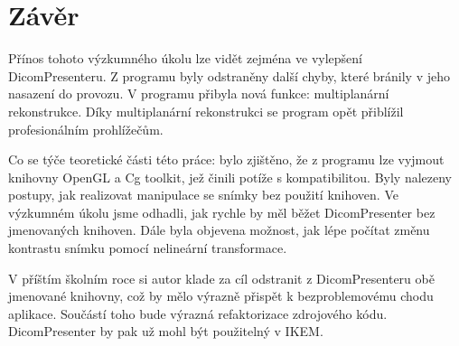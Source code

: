 \chapter*{Závěr}
\vspace{-10mm}
Přínos tohoto výzkumného úkolu lze vidět zejména ve vylepšení DicomPresenteru. Z programu byly odstraněny další chyby, které bránily v jeho nasazení do provozu. V programu přibyla nová funkce: multiplanární rekonstrukce. Díky multiplanární rekonstrukci se program opět přiblížil profesionálním prohlížečům.

Co se týče teoretické části této práce: bylo zjištěno, že z programu lze vyjmout knihovny OpenGL a Cg toolkit, jež činili potíže s kompatibilitou. Byly nalezeny postupy, jak realizovat manipulace se snímky bez použití knihoven. Ve výzkumném úkolu jsme odhadli, jak rychle by měl běžet DicomPresenter bez jmenovaných knihoven. Dále byla objevena možnost, jak lépe počítat změnu kontrastu snímku pomocí nelineární transformace.

V příštím školním roce si autor klade za cíl odstranit z DicomPresenteru obě jmenované knihovny, což by mělo výrazně přispět k bezproblemovému chodu aplikace. Součástí toho bude výrazná refaktorizace zdrojového kódu. DicomPresenter by pak už mohl být použitelný v IKEM.